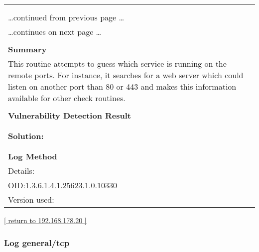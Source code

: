 \documentclass{article}
\begin{document}
\begin{longtable}{|p{}|}
\hline
\rowcolor{gvm_log}{\color{white}{Log (CVSS: 0.0) }}\\
\rowcolor{gvm_log}{\color{white}{NVT: Services}}\\
\hline
\endfirsthead
\hfill\ldots continued from previous page \ldots \\
\hline
\endhead
\hline
\ldots continues on next page \ldots \\
\endfoot
\hline
\endlastfoot
\\
\textbf{Summary}\\
This routine attempts to guess which service is running on the
  remote ports. For instance, it searches for a web server which could listen on another port than
  80 or 443 and makes this information available for other check routines.\\

        \hline
        \\
\textbf{Vulnerability Detection Result}\\
\rowcolor{white}{\verb=An ssh server is running on this port=}\\

          \hline
          \\
\textbf{Solution:}\\
\\


        \hline
        \\
\textbf{Log Method}\\
Details:
\rowcolor{white}{\verb=Services=}\\
OID:1.3.6.1.4.1.25623.1.0.10330\\
Version used:
\rowcolor{white}{\verb=2021-03-15T10:42:03Z=}\\
\end{longtable}

\begin{footnotesize}\hyperref[host:192.168.178.20]{[ return to 192.168.178.20 ]}\end{footnotesize}
\subsubsection{Log general/tcp}
\label{port:192.168.178.20 general/tcp Log}
\end{document}
